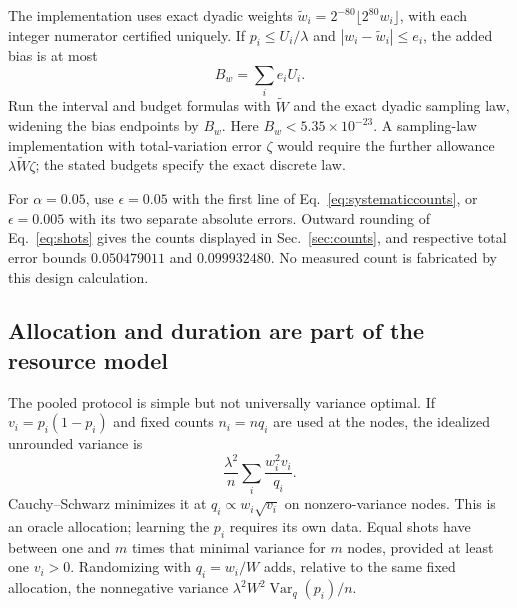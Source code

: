 \documentclass[aps,pra,reprint,superscriptaddress,longbibliography]{revtex4-2}
\newcommand{\Var}{\operatorname{Var}}
\begin{document}
The implementation uses exact dyadic weights
$\widetilde w_i=2^{-80}\lfloor2^{80}w_i\rfloor$, with each integer
numerator certified uniquely. If $p_i\le U_i/\lambda$ and
$|w_i-\widetilde w_i|\le e_i$, the added bias is at most
\begin{equation}
             B_w=\sum_i e_iU_i.                              \label{eq:roundweight}
\end{equation}
Run the interval and budget formulas with $\widetilde W$ and the
exact dyadic sampling law, widening the bias endpoints by $B_w$.
Here $B_w<5.35\times10^{-23}$. A sampling-law implementation with
total-variation error $\zeta$ would require the further allowance
$\lambda\widetilde W\zeta$; the stated budgets specify the exact
discrete law.

For $\alpha=0.05$, use $\epsilon=0.05$ with the first line of
Eq.~\eqref{eq:systematiccounts}, or $\epsilon=0.005$ with its two
separate absolute errors. Outward rounding of Eq.~\eqref{eq:shots}
gives the counts displayed in Sec.~\ref{sec:counts}, and respective
total error bounds $0.050479011$ and $0.099932480$.
No measured count is fabricated by this design calculation.

\subsection{Allocation and duration are part of the resource model}

The pooled protocol is simple but not universally variance optimal.
If $v_i=p_i(1-p_i)$ and fixed counts $n_i=nq_i$ are used at the
nodes, the idealized unrounded variance is
\begin{equation}
 \frac{\lambda^2}{n}\sum_i\frac{w_i^2v_i}{q_i}.
\end{equation}
Cauchy--Schwarz minimizes it at
$q_i\propto w_i\sqrt{v_i}$ on nonzero-variance nodes. This is an
oracle allocation; learning the $p_i$ requires its own data. Equal
shots have between one and $m$ times that minimal variance for
$m$ nodes, provided at least one $v_i>0$. Randomizing with
$q_i=w_i/W$ adds, relative to the same
fixed allocation, the nonnegative variance
$\lambda^2W^2\Var_q(p_i)/n$.
\end{document}
